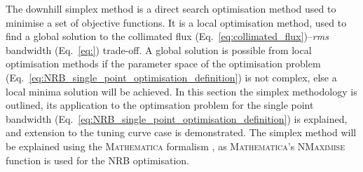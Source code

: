 \documentclass[../main.tex]{subfiles}
\begin{document}
The downhill simplex method is a direct search optimisation method used to minimise a set of objective functions. It is a local optimisation method, used to find a global solution to the collimated flux (Eq.~\ref{eq:collimated_flux})--\textit{rms} bandwidth (Eq.~\ref{eq:}) trade-off. A global solution is possible from local optimisation methods if the parameter space of the optimisation problem (Eq.~\ref{eq:NRB_single_point_optimisation_definition}) is not complex, else a local minima solution will be achieved. In this section the simplex methodology is outlined, its application to the optimsation problem for the single point bandwidth (Eq.~\ref{eq:NRB_single_point_optimisation_definition}) is explained, and extension to the tuning curve case is demonstrated. The simplex method will be explained using the \textsc{Mathematica} formalism \cite{wolfram2021nmaximize}, as \textsc{Mathematica}'s \textsc{NMaximise} function is used for the NRB optimisation.
\end{document}
